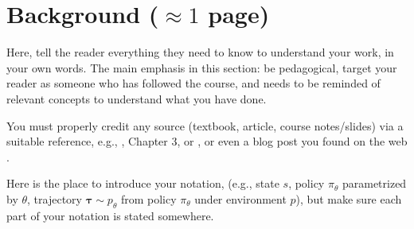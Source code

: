 \documentclass[../CSC_52081_EP.tex]{subfiles}
\begin{document}
    \section{Background ($\approx 1$ page)}
    \label{sec:background}

    Here, tell the reader everything they need to know to understand your work, in your own words. The main emphasis in this section: be pedagogical, target your reader as someone who has followed the course,  and needs to be reminded of relevant concepts to understand what you have done. 

    You must properly credit any source (textbook, article, course notes/slides) via a suitable reference,  e.g., \cite{RLBook}, Chapter 3, or \cite{Lecture4}, or even a blog post you found on the web \cite{Post3}. 

    Here is the place to introduce your notation, (e.g., state $s$, policy $\pi_\theta$ parametrized by $\theta$, trajectory $\boldsymbol\tau \sim p_\theta$ from policy $\pi_\theta$ under environment $p$), but make sure each part of your notation is stated somewhere. 
\end{document}
